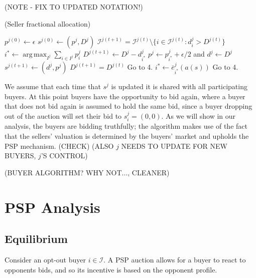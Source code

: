 \documentclass[12pt]{article}
\theoremstyle{definition}
\newcommand{\mcI}{\mathcal{I}}
\DeclareMathOperator*{\argmax}{arg\,max}
\begin{document}
\begin{multicols}{2}
(NOTE - FIX TO UPDATED NOTATION!)
\begin{algorithm}[H]
\caption{(Seller fractional allocation)}
\begin{algorithmic}[1]
\State $p^{j(0)} \gets \epsilon$
\State $s^{j(0)} \gets (p^j, D^j)$
\State $\mcI^{j(t+1)} = \mcI^{j(t)}\setminus \lbrace i \in \mcI^{j(t)}: d_i^j >
D^{j(t)}\rbrace$
\State $ i^* \gets \displaystyle\argmax_{I^j}\sum_{i\in I^j} p_i^j$ 
\State $D^{j(t+1)} \gets D^j - d_{i^*}^{j}$
\State $p^j \gets p_{i^*}^j+\epsilon/2$ and $d^j \gets D^j$
\State $s^{j(t+1)} \gets (d^j, p^j)$
\State $D^{j(t+1)} = D^{j(t)}$
\State Go to 4.
\Else
\State $i^* \gets \bar e_{i^*}^j(a(s))$
\State Go to 4.
\EndIf
\EndWhile
\end{algorithmic}
\end{algorithm}
We assume that each time that $s^j$ is updated it is shared with all
participating buyers. At this point buyers have the opportunity to bid again,
where a buyer that does not bid again is assumed to hold the same bid, since a
buyer dropping out of the auction will set their bid to $s_i^j=(0,0)$. As we will show in our analysis, the buyers are bidding truthfully; the
algorithm makes use of the fact that the sellers' valuation is determined by
the buyers' market and upholds the PSP mechanism. (CHECK) (ALSO $j$ NEEDS TO
UPDATE FOR NEW BUYERS, $j$'S CONTROL)

(BUYER ALGORITHM? WHY NOT..., CLEANER)

\section{PSP Analysis}\label{analysis}
\subsection{Equilibrium}

Consider an opt-out buyer $i\in\mcI$. A PSP auction
allows for a buyer to react to opponents bids, and so its incentive is based on
the opponent profile.


\end{multicols}
\end{document}
